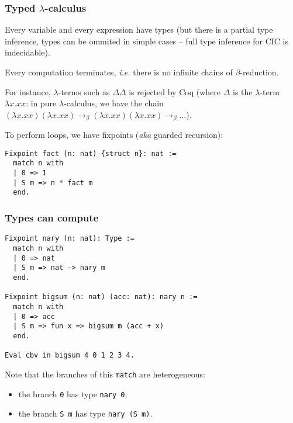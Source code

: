\documentclass{beamer}
\begin{document}
\begin{frame}[fragile]
  \frametitle{Typed \(\lambda\)-calculus}

  Every variable and every expression have types (but there is a partial type inference, types can be ommited in simple cases -- full type inference for CIC is indecidable).

  \vfill

  \begin{theorem}
    Every computation terminates, \emph{i.e.} there is no infinite chains of  \(\beta\)-reduction.
  \end{theorem}

  \vfill

  For instance, \(\lambda\)-terms such as \(\Delta \Delta\) is rejected by Coq (where \(\Delta\) is the \(\lambda\)-term \(\lambda x . x x\): in pure \(\lambda\)-calculus, we have the chain
\((\lambda x . x x)(\lambda x . x x) \rightarrow_\beta (\lambda x . x x)(\lambda x . x x) \rightarrow_\beta ...\)).

  To perform loops, we have fixpoints (\emph{aka} guarded recursion):

  \begin{verbatim}
Fixpoint fact (n: nat) {struct n}: nat :=
  match n with
  | 0 => 1
  | S m => n * fact m
  end.
  \end{verbatim}
\end{frame}
\begin{frame}[fragile]
  \frametitle{Types can compute}

\begin{verbatim}
Fixpoint nary (n: nat): Type :=
  match n with
  | 0 => nat
  | S m => nat -> nary m
  end.

Fixpoint bigsum (n: nat) (acc: nat): nary n :=
  match n with
  | 0 => acc
  | S m => fun x => bigsum m (acc + x)
  end.

Eval cbv in bigsum 4 0 1 2 3 4.
\end{verbatim}

\vfill

Note that the branches of this \texttt{match} are heterogeneous:
\begin{itemize}
\item the branch \texttt{0} has type \texttt{nary 0},
\item the branch \texttt{S m} has type \texttt{nary (S m)}.
\end{itemize}
\end{frame}
\end{document}
